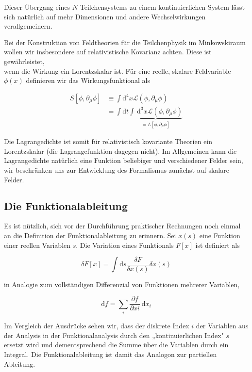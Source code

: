 \documentclass[10pt, letterpaper]{article}
\begin{document}
Dieser Übergang eines $N$-Teilchensystems zu einem kontinuierlichen System lässt sich natürlich auf mehr Dimensionen und andere Wechselwirkungen verallgemeinern.

Bei der Konstruktion von Feldtheorien für die Teilchenphysik im Minkowskiraum wollen wir insbesondere auf relativistische Kovarianz achten. Diese ist gewährleistet,\\
wenn die Wirkung ein Lorentzskalar ist. Für eine reelle, skalare Feldvariable $\phi(x)$ definieren wir das Wirkungsfunktional als

$$
\begin{aligned}
S\left[\phi, \partial_{\mu} \phi\right] & \equiv \int \mathrm{d}^{4} x \mathscr{L}\left(\phi, \partial_{\mu} \phi\right) \\
& =\int \mathrm{d} t \underbrace{\int \mathrm{~d}^{3} x \mathscr{L}\left(\phi, \partial_{\mu} \phi\right)}_{=L\left[\phi, \partial_{\mu} \phi\right]}
\end{aligned}
$$

Die Lagrangedichte ist somit für relativistisch kovariante Theorien ein Lorentzskalar (die Lagrangefunktion dagegen nicht). Im Allgemeinen kann die Lagrangedichte natürlich eine Funktion beliebiger und verschiedener Felder sein, wir beschränken uns zur Entwicklung des Formalismus zunächst auf skalare Felder.


\pagebreak

\subsection{Die Funktionalableitung}
Es ist nützlich, sich vor der Durchführung praktischer Rechnungen noch einmal an die Definition der Funktionalableitung zu erinnern. Sei $x(s)$ eine Funktion einer reellen Variablen $s$. Die Variation eines Funktionals $F[x]$ ist definiert als

$$
\delta F[x]=\int \mathrm{d} s \frac{\delta F}{\delta x(s)} \delta x(s)
$$

in Analogie zum vollständigen Differenzial von Funktionen mehrerer Variablen,

$$
\mathrm{d} f=\sum_{i} \frac{\partial f}{\partial x i} \mathrm{~d} x_{i}
$$

Im Vergleich der Ausdrücke sehen wir, dass der diskrete Index $i$ der Variablen aus der Analysis in der Funktionalanalysis durch den „kontinuierlichen Index" $s$ ersetzt wird und dementsprechend die Summe über die Variablen durch ein Integral. Die Funktionalableitung ist damit das Analogon zur partiellen Ableitung.
\end{document}

